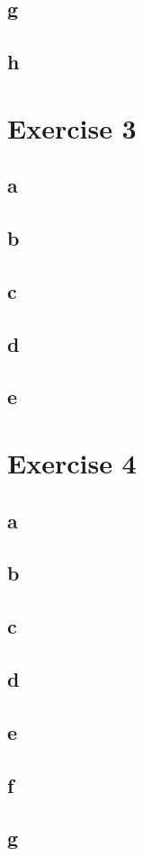 \documentclass{article}
\begin{document}
\subsection{g}

\subsection{h}

\section{Exercise 3}
\subsection{a}

\subsection{b}

\subsection{c}

\subsection{d}

\subsection{e}

\section{Exercise 4}
\subsection{a}

\subsection{b}

\subsection{c}

\subsection{d}

\subsection{e}

\subsection{f}

\subsection{g}
\end{document}

